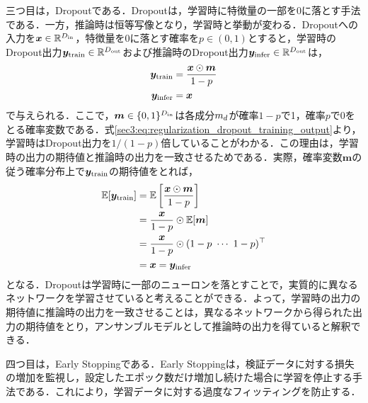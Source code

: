 \documentclass[12pt]{jarticle}
\numberwithin{equation}{section}    %
\numberwithin{figure}{section}      %
\numberwithin{table}{section}      %
\begin{document}
三つ目は，Dropout\cite{srivastava2014dropout}である．Dropoutは，学習時に特徴量の一部を0に落とす手法である．一方，推論時は恒等写像となり，学習時と挙動が変わる．Dropoutへの入力を$\bm{x} \in \mathbb{R}^{D_{\text{in}}}$，特徴量を0に落とす確率を$p \in (0, 1)$とすると，学習時のDropout出力$\bm{y}_{\text{train}} \in \mathbb{R}^{D_{\text{out}}}$および推論時のDropout出力$\bm{y}_{\text{infer}} \in \mathbb{R}^{D_{\text{out}}}$は，
\begin{align}
    \bm{y}_{\text{train}} & = \frac{\bm{x} \odot \bm{m}}{1 - p} \label{sec3:eq:regularization_dropout_training_output} \\
    \bm{y}_{\text{infer}} & = \bm{x}
\end{align}
で与えられる．ここで，$\bm{m} \in \{0, 1\}^{D_{\text{in}}}$は各成分$m_{d}$が確率$1 - p$で1，確率$p$で0をとる確率変数である．式\eqref{sec3:eq:regularization_dropout_training_output}より，学習時はDropout出力を$1 / (1 - p)$倍していることがわかる．この理由は，学習時の出力の期待値と推論時の出力を一致させるためである．実際，確率変数$\bm{m}$の従う確率分布上で$\bm{y}_{\text{train}}$の期待値をとれば，
\begin{align}
    \mathbb{E}[\bm{y}_{\text{train}}] & = \mathbb{E} \left[ \frac{\bm{x} \odot \bm{m}}{1 - p} \right] \\
                                                 & = \frac{\bm{x}}{1 - p} \odot \mathbb{E}[\bm{m}]               \\
                                                 & = \frac{\bm{x}}{1 - p} \odot (1 - p ~ \cdots ~ 1 - p)^\top    \\
                                                 & = \bm{x} = \bm{y}_{\text{infer}}
\end{align}
となる．Dropoutは学習時に一部のニューロンを落とすことで，実質的に異なるネットワークを学習させていると考えることができる．よって，学習時の出力の期待値に推論時の出力を一致させることは，異なるネットワークから得られた出力の期待値をとり，アンサンブルモデルとして推論時の出力を得ていると解釈できる．

四つ目は，Early Stoppingである．Early Stoppingは，検証データに対する損失の増加を監視し，設定したエポック数だけ増加し続けた場合に学習を停止する手法である．これにより，学習データに対する過度なフィッティングを防止する．
\end{document}
